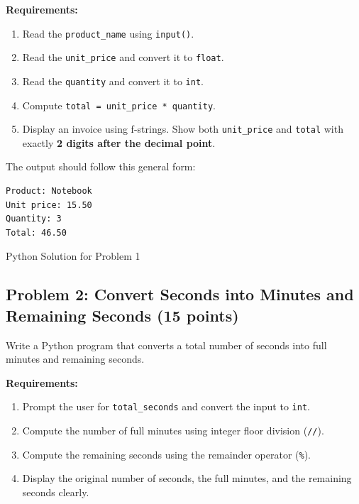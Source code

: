\documentclass[11pt,a4paper]{article}
\begin{document}
\textbf{Requirements:}
\begin{enumerate}[leftmargin=2em,label=\arabic*.,itemsep=2pt]
  \item Read the \texttt{product\_name} using \texttt{input()}.
  \item Read the \texttt{unit\_price} and convert it to \texttt{float}.
  \item Read the \texttt{quantity} and convert it to \texttt{int}.
  \item Compute \texttt{total = unit\_price * quantity}.
  \item Display an invoice using f-strings. Show both \texttt{unit\_price} and \texttt{total} with exactly \textbf{2 digits after the decimal point}.
\end{enumerate}

The output should follow this general form:
\begin{lstlisting}
Product: Notebook
Unit price: 15.50
Quantity: 3
Total: 46.50
\end{lstlisting}

\begin{answerbox}[height=14.7cm]{Python Solution for Problem 1}
\end{answerbox}

\newpage


\subsection*{Problem 2: Convert Seconds into Minutes and Remaining Seconds (15 points)}
Write a Python program that converts a total number of seconds into full minutes and remaining seconds.

\textbf{Requirements:}
\begin{enumerate}[leftmargin=2em,label=\arabic*.,itemsep=2pt]
  \item Prompt the user for \texttt{total\_seconds} and convert the input to \texttt{int}.
  \item Compute the number of full minutes using integer floor division (\texttt{//}).
  \item Compute the remaining seconds using the remainder operator (\texttt{\%}).
  \item Display the original number of seconds, the full minutes, and the remaining seconds clearly.
\end{enumerate}
\end{document}
